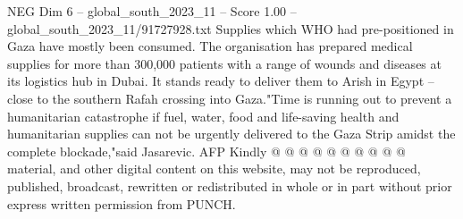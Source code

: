 \begin{textsample}{NEG Dim 6 – global\_south\_2023\_11 – Score 1.00 – global\_south\_2023\_11/91727928.txt}
Supplies which WHO had pre-positioned in Gaza have mostly been consumed.
The organisation has prepared medical supplies for more than 300,000 patients with a range of wounds and diseases at its logistics hub in Dubai.
It stands ready to deliver them to Arish in Egypt -- close to the southern Rafah crossing into Gaza."Time is running out to prevent a humanitarian catastrophe if fuel, water, food and life-saving health and humanitarian supplies can not be urgently delivered to the Gaza Strip amidst the complete blockade,"said Jasarevic.
AFP Kindly @ @ @ @ @ @ @ @ @ @ material, and other digital content on this website, may not be reproduced, published, broadcast, rewritten or redistributed in whole or in part without prior express written permission from PUNCH.

\end{textsample}
